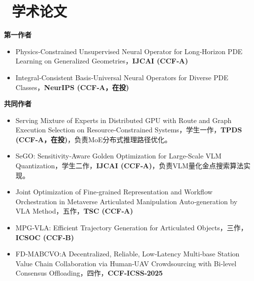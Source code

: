\documentclass[11pt]{article}
\begin{document}
\section{\makebox[\widthof{\faFileTextO}][c]{\color{CVBlue}\faFileTextO}\ 学术论文}
\textbf{第一作者}
\begin{itemize}
    \item Physics‑Constrained Unsupervised Neural Operator for Long‑Horizon PDE Learning on Generalized Geometries，\textbf{IJCAI (CCF‑A)}
    \item Integral‑Consistent Basis‑Universal Neural Operators for Diverse PDE Classes，\textbf{NeurIPS (CCF‑A，在投)}
\end{itemize}

\textbf{共同作者}
\begin{itemize}
    \item Serving Mixture of Experts in Distributed GPU with Route and Graph Execution Selection on Resource‑Constrained Systems，学生一作，\textbf{TPDS (CCF‑A，在投)}，负责MoE分布式推理路径优化。
    \item SeGO: Sensitivity‑Aware Golden Optimization for Large‑Scale VLM Quantization，学生二作，\textbf{IJCAI (CCF‑A)}，负责VLM量化金点搜索算法实现。
    \item Joint Optimization of Fine‑grained Representation and Workflow Orchestration in Metaverse Articulated Manipulation Auto‑generation by VLA Method，五作，\textbf{TSC (CCF‑A)}
    \item MPG‑VLA: Efficient Trajectory Generation for Articulated Objects，三作，\textbf{ICSOC (CCF‑B)}
    \item FD‑MABCVO:A Decentralized, Reliable, Low‑Latency Multi‑base Station Value Chain Collaboration via Human‑UAV Crowdsourcing with Bi‑level Consensus Offloading，四作，\textbf{CCF‑ICSS‑2025}
\end{itemize}

\end{document}
